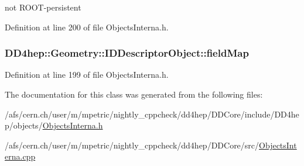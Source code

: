 not ROOT-\/persistent 

Definition at line 200 of file ObjectsInterna.h.\hypertarget{class_d_d4hep_1_1_geometry_1_1_i_d_descriptor_object_a56d35066c16243ed986ee35c789b5a2a}{
\subsubsection[{fieldMap}]{ {\bf DD4hep::Geometry::IDDescriptorObject::fieldMap}}}
\label{class_d_d4hep_1_1_geometry_1_1_i_d_descriptor_object_a56d35066c16243ed986ee35c789b5a2a}


Definition at line 199 of file ObjectsInterna.h.

The documentation for this class was generated from the following files:\begin{DoxyCompactItemize}
\item 
/afs/cern.ch/user/m/mpetric/nightly\_\-cppcheck/dd4hep/DDCore/include/DD4hep/objects/\hyperlink{_objects_interna_8h}{ObjectsInterna.h}\item 
/afs/cern.ch/user/m/mpetric/nightly\_\-cppcheck/dd4hep/DDCore/src/\hyperlink{_objects_interna_8cpp}{ObjectsInterna.cpp}\end{DoxyCompactItemize}
